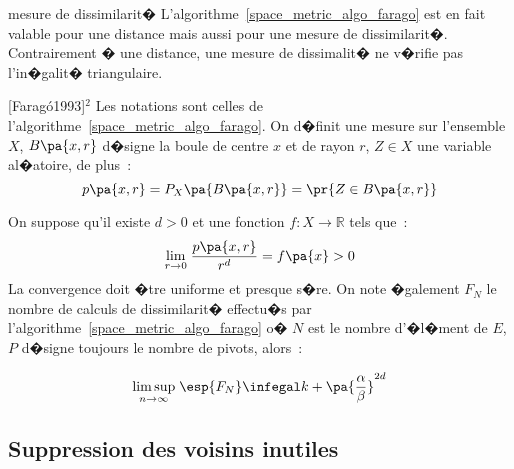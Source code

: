 \begin{xremark}{mesure de dissimilarit�}
L'algorithme~\ref{space_metric_algo_farago} est en fait valable pour une distance mais aussi pour une mesure de dissimilarit�. Contrairement � une distance, une mesure de dissimalit� ne v�rifie pas l'in�galit� triangulaire.
\end{xremark}


            \begin{xtheorem}{[Farag\'o1993]$^2$}
                                                                \label{space_metric_farago_2}
            Les notations sont celles de l'algorithme~\ref{space_metric_algo_farago}. On d�finit une mesure 
            sur l'ensemble $X$, $B\pa{x,r}$ d�signe la boule de centre $x$ et de rayon $r$, $Z \in X$ une variable 
            al�atoire, de plus~:
                        $$
                        p\pa{x,r} = P_X \pa{B\pa{x,r}} = \pr{  Z \in B\pa{x,r}}
                        $$
                        
            On suppose qu'il existe $d > 0$ et une fonction $f : X \longrightarrow \mathbb{R}$ tels que~:
                        $$
                        \underset { r \rightarrow 0 } { \lim } \; \frac{ p\pa{x,r} } { r^d } = f\pa{x} > 0
                        $$
          La convergence doit �tre uniforme et presque s�re.
          On note �galement $F_N$ le nombre de calculs de dissimilarit� effectu�s par 
          l'algorithme~\ref{space_metric_algo_farago} o� $N$ est le nombre d'�l�ment de $E$, 
          $P$ d�signe toujours le nombre de pivots, alors~:
          
                      $$
                      \underset{ n \rightarrow \infty } { \lim \sup } \;
                                      \esp{F_N} \infegal k + \pa{\frac{\alpha}{\beta}}^{2d}
                      $$
                                                                            
            \end{xtheorem}









\subsection{Suppression des voisins inutiles}
\label{space_metric_suppression_voisins_inutile}

